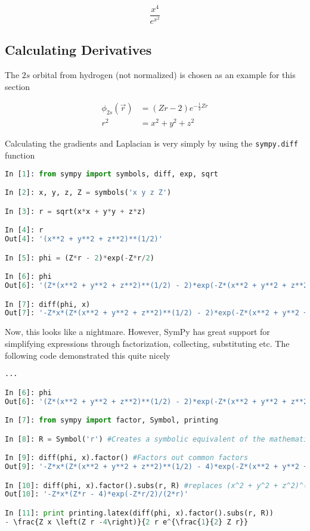 \begin{equation*}
 \frac{x^{4}}{e^{x^{2}}}
\end{equation*}

\subsection{Calculating Derivatives}

The $2s$ orbital from hydrogen (not normalized) is chosen as an example for this section

\begin{align}
 \phi_{2s}(\vec r) &= (Zr - 2)e^{-\frac{1}{2}Zr} \\
 r^2 &= x^2 + y^2 + z^2
\end{align}

Calculating the gradients and Laplacian is very simply by using the \verb+sympy.diff+ function

\vspace{0.25cm}
\begin{lstlisting}[language=Python]
In [1]: from sympy import symbols, diff, exp, sqrt

In [2]: x, y, z, Z = symbols('x y z Z')

In [3]: r = sqrt(x*x + y*y + z*z)

In [4]: r
Out[4]: '(x**2 + y**2 + z**2)**(1/2)'

In [5]: phi = (Z*r - 2)*exp(-Z*r/2)

In [6]: phi
Out[6]: '(Z*(x**2 + y**2 + z**2)**(1/2) - 2)*exp(-Z*(x**2 + y**2 + z**2)**(1/2)/2)'

In [7]: diff(phi, x)
Out[7]: '-Z*x*(Z*(x**2 + y**2 + z**2)**(1/2) - 2)*exp(-Z*(x**2 + y**2 + z**2)**(1/2)/2)/(2*(x**2 + y**2 + z**2)**(1/2)) + Z*x*exp(-Z*(x**2 + y**2 + z**2)**(1/2)/2)/(x**2 + y**2 + z**2)**(1/2)'

\end{lstlisting}

Now, this looks like a nightmare. However, SymPy has great support for simplifying expressions through factorization, collecting, substituting etc. The following code demonstrated this quite nicely

\vspace{0.25cm}
\begin{lstlisting}[language=Python]
...

In [6]: phi
Out[6]: '(Z*(x**2 + y**2 + z**2)**(1/2) - 2)*exp(-Z*(x**2 + y**2 + z**2)**(1/2)/2)'

In [7]: from sympy import factor, Symbol, printing

In [8]: R = Symbol('r') #Creates a symbolic equivalent of the mathematical r

In [9]: diff(phi, x).factor() #Factors out common factors
Out[9]: '-Z*x*(Z*(x**2 + y**2 + z**2)**(1/2) - 4)*exp(-Z*(x**2 + y**2 + z**2)**(1/2)/2)/(2*(x**2 + y**2 + z**2)**(1/2))'

In [10]: diff(phi, x).factor().subs(r, R) #replaces (x^2 + y^2 + z^2)^(1/2) with r
Out[10]: '-Z*x*(Z*r - 4)*exp(-Z*r/2)/(2*r)'

In [11]: print printing.latex(diff(phi, x).factor().subs(r, R))
- \frac{Z x \left(Z r -4\right)}{2 r e^{\frac{1}{2} Z r}}

\end{lstlisting}


